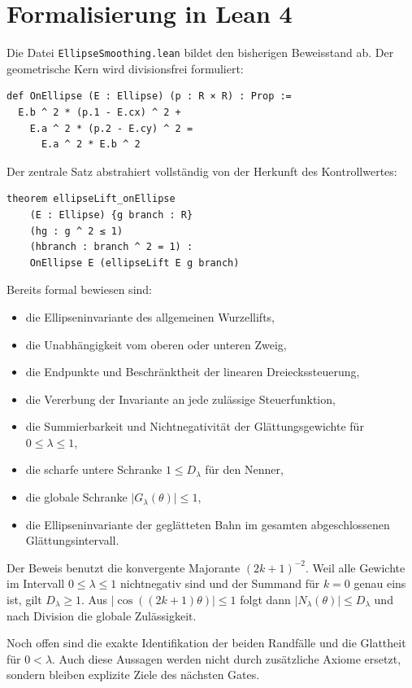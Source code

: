 \section{Formalisierung in Lean 4}

Die Datei \texttt{EllipseSmoothing.lean} bildet den bisherigen Beweisstand ab.
Der geometrische Kern wird divisionsfrei formuliert:

\begin{lstlisting}
def OnEllipse (E : Ellipse) (p : R × R) : Prop :=
  E.b ^ 2 * (p.1 - E.cx) ^ 2 +
    E.a ^ 2 * (p.2 - E.cy) ^ 2 =
      E.a ^ 2 * E.b ^ 2
\end{lstlisting}

Der zentrale Satz abstrahiert vollständig von der Herkunft des Kontrollwertes:

\begin{lstlisting}
theorem ellipseLift_onEllipse
    (E : Ellipse) {g branch : R}
    (hg : g ^ 2 ≤ 1)
    (hbranch : branch ^ 2 = 1) :
    OnEllipse E (ellipseLift E g branch)
\end{lstlisting}

Bereits formal bewiesen sind:
\begin{itemize}
  \item die Ellipseninvariante des allgemeinen Wurzellifts,
  \item die Unabhängigkeit vom oberen oder unteren Zweig,
  \item die Endpunkte und Beschränktheit der linearen Dreieckssteuerung,
  \item die Vererbung der Invariante an jede zulässige Steuerfunktion,
  \item die Summierbarkeit und Nichtnegativität der Glättungsgewichte für
        $0\leq\lambda\leq1$,
  \item die scharfe untere Schranke $1\leq D_\lambda$ für den Nenner,
  \item die globale Schranke $\lvert G_\lambda(\theta)\rvert\leq1$,
  \item die Ellipseninvariante der geglätteten Bahn im gesamten
        abgeschlossenen Glättungsintervall.
\end{itemize}

Der Beweis benutzt die konvergente Majorante $(2k+1)^{-2}$. Weil alle Gewichte
im Intervall $0\leq\lambda\leq1$ nichtnegativ sind und der Summand für $k=0$
genau eins ist, gilt $D_\lambda\geq1$. Aus
$\lvert\cos((2k+1)\theta)\rvert\leq1$ folgt dann
$\lvert N_\lambda(\theta)\rvert\leq D_\lambda$ und nach Division die globale
Zulässigkeit.

Noch offen sind die exakte Identifikation der beiden Randfälle und die
Glattheit für $0<\lambda$. Auch diese Aussagen werden nicht durch zusätzliche
Axiome ersetzt, sondern bleiben explizite Ziele des nächsten Gates.
